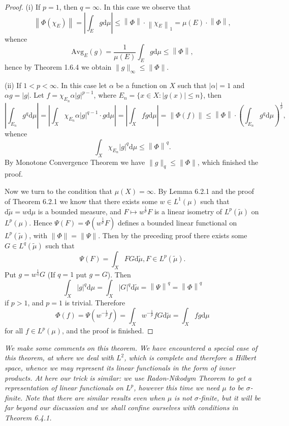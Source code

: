 \begin{proof}
(i) If $p=1$, then $q=\infty$. In this case we observe that 
$$
\left\| \Phi \left( \chi _E \right) \right\| =\left| \int_E{g\mathrm{d}\mu} \right|\le \left\| \Phi \right\| \cdot \left\| \chi _E \right\| _1=\mu \left( E \right) \cdot \left\| \Phi \right\| ,
$$
whence 
$$
\mathrm{Avg}_E\left( g \right) =\frac{1}{\mu \left( E \right)}\int_E{g\mathrm{d}\mu}\le \left\| \Phi \right\| ,
$$
hence by Theorem 1.6.4 we obtain $\|g\|_\infty\le\|\Phi\|$.\par
(ii) If $1<p<\infty$. In this case let $\alpha$ be a function on $X$ such that $|\alpha|=1$ and $\alpha g=|g|$. Let $f=\chi_{E_n}\alpha|g|^{p-1}$, where $E_n=\{x\in X:|g(x)|\le n\}$, then 
$$
\left| \int_{E_n}{g^q\mathrm{d}\mu} \right|=\left| \int_X{\chi _{E_n}\alpha \left| g \right|^{q-1}\cdot g\mathrm{d}\mu} \right|=\left| \int_X{fg\mathrm{d}\mu} \right|=\left\| \Phi \left( f \right) \right\| \le \left\| \Phi \right\| \cdot \left( \int_{E_n}{g^q\mathrm{d}\mu} \right) ^{\frac{1}{p}},
$$
whence 
$$
\int_X{\chi _{E_n}\left| g \right|^q\mathrm{d}\mu}\le \left\| \Phi \right\| ^q.
$$
By Monotone Convergence Theorem we have $\|g\|_q\le\|\Phi\|$, which finished the proof.\par
Now we turn to the condition that $\mu(X)=\infty$. By Lemma 6.2.1 and the proof of Theorem 6.2.1 we know that there exists some $w\in L^1(\mu)$ such that $\mathrm{d}\widetilde{\mu}=w\mathrm{d}\mu$ is a bounded measure, and $F\mapsto w^{\frac{1}{p}}F$ is a linear isometry of $L^p(\widetilde{\mu})$ on $L^p(\mu)$. Hence $\Psi(F)=\Phi\left(w^{\frac{1}{p}}F\right)$ defines a bounded linear functional on $L^p(\widetilde{\mu})$, with $\|\Phi\|=\|\Psi\|$. Then by the preceding proof there exists some $G\in L^q(\widetilde{\mu})$ such that 
$$
\Psi \left( F \right) =\int_X{FG\mathrm{d}\widetilde{\mu }},F\in L^p\left( \widetilde{\mu } \right) .
$$
Put $g=w^{\frac{1}{q}}G$ (If $q=1$ put $g=G$). Then 
$$
\int_X{\left| g \right|^q\mathrm{d}\mu}=\int_X{\left| G \right|^q\mathrm{d}\widetilde{\mu }}=\left\| \Psi \right\| ^q=\left\| \Phi \right\| ^q
$$
if $p>1$, and $p=1$ is trivial. Therefore 
$$
\Phi \left( f \right) =\Psi \left( w^{-\frac{1}{p}}f \right) =\int_X{w^{-\frac{1}{p}}fG\mathrm{d}\widetilde{\mu }}=\int_X{fg\mathrm{d}\mu}
$$
for all $f\in L^p(\mu)$, and the proof is finished.
\end{proof}
\begin{note}\em
We make some comments on this theorem. We have encountered a special case of this theorem, at where we deal with $L^2$, which is complete and therefore a Hilbert space, whence we may represent its linear functionals in the form of inner products. At here our trick is similar: we use Radon-Nikodym Theorem to get a representation of linear functionals on $L^p$, however this time we need $\mu$ to be $\sigma$-finite. Note that there are similar results even when $\mu$ is not $\sigma$-finite, but it will be far beyond our discussion and we shall confine ourselves with conditions in Theorem 6.4.1.
\end{note}
